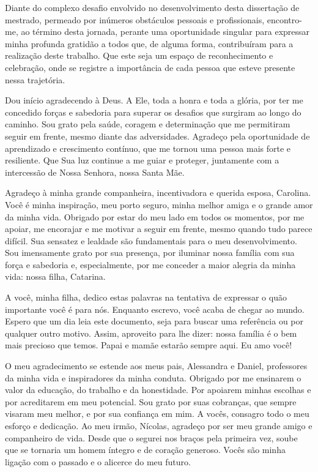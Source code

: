 \begin{agradecimentos}

    Diante do complexo desafio envolvido no desenvolvimento desta dissertação de mestrado, permeado por inúmeros obstáculos pessoais e profissionais, encontro-me, ao término desta jornada, perante uma oportunidade singular para expressar minha profunda gratidão a todos que, de alguma forma, contribuíram para a realização deste trabalho. Que este seja um espaço de reconhecimento e celebração, onde se registre a importância de cada pessoa que esteve presente nessa trajetória.

    Dou início agradecendo à Deus. A Ele, toda a honra e toda a glória, por ter me concedido forças e sabedoria para superar os desafios que surgiram ao longo do caminho. Sou grato pela saúde, coragem e determinação que me permitiram seguir em frente, mesmo diante das adversidades. Agradeço pela oportunidade de aprendizado e crescimento contínuo, que me tornou uma pessoa mais forte e resiliente. Que Sua luz continue a me guiar e proteger, juntamente com a intercessão de Nossa Senhora, nossa Santa Mãe.

    Agradeço à minha grande companheira, incentivadora e querida esposa, Carolina. Você é minha inspiração, meu porto seguro, minha melhor amiga e o grande amor da minha vida. Obrigado por estar do meu lado em todos os momentos, por me apoiar, me encorajar e me motivar a seguir em frente, mesmo quando tudo parece difícil. Sua sensatez e lealdade são fundamentais para o meu desenvolvimento. Sou imensamente grato por sua presença, por iluminar nossa família com sua força e sabedoria e, especialmente, por me conceder a maior alegria da minha vida: nossa filha, Catarina.

    A você, minha filha, dedico estas palavras na tentativa de expressar o quão importante você é para nós. Enquanto escrevo, você acaba de chegar ao mundo. Espero que um dia leia este documento, seja para buscar uma referência ou por qualquer outro motivo. Assim, aproveito para lhe dizer: nossa família é o bem mais precioso que temos. Papai e mamãe estarão sempre aqui. Eu amo você!

    O meu agradecimento se estende aos meus pais, Alessandra e Daniel, professores da minha vida e inspiradores da minha conduta. Obrigado por me ensinarem o valor da educação, do trabalho e da honestidade. Por apoiarem minhas escolhas e por acreditarem em meu potencial. Sou grato por suas cobranças, que sempre visaram meu melhor, e por sua confiança em mim. A vocês, consagro todo o meu esforço e dedicação. Ao meu irmão, Nícolas, agradeço por ser meu grande amigo e companheiro de vida. Desde que o segurei nos braços pela primeira vez, soube que se tornaria um homem íntegro e de coração generoso. Vocês são minha ligação com o passado e o alicerce do meu futuro.


\end{agradecimentos}
